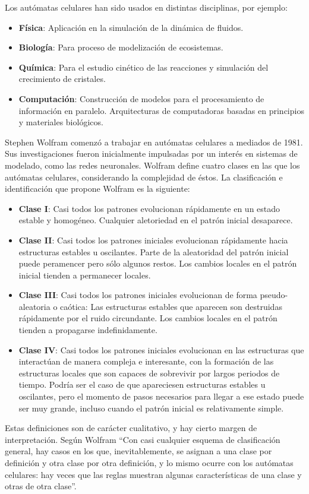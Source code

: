     Los autómatas celulares han sido usados en distintas disciplinas, por ejemplo:
      \begin{itemize}
        \item{\textbf{Física}: Aplicación en la simulación de la dinámica de fluidos.}
        \item{\textbf{Biología}: Para proceso de modelización de ecosistemas.}
        \item{\textbf{Química}: Para el estudio cinético de las reacciones y simulación del crecimiento de cristales.}
        \item{\textbf{Computación}: Construcción de modelos para el procesamiento de información en paralelo. Arquitecturas de computadoras basadas en principios y materiales biológicos. \cite{10}}
      \end{itemize}
    Stephen Wolfram comenzó a trabajar en autómatas celulares a mediados de 1981. Sus investigaciones fueron inicialmente impulsadas por un interés en sistemas de modelado, como las redes neuronales. Wolfram define cuatro clases en las que los autómatas celulares, considerando la complejidad de éstos. La clasificación e identificación que propone Wolfram es la siguiente:
      \begin{itemize}
        \item{\textbf{Clase I}: Casi todos los patrones evolucionan rápidamente en un estado estable y homogéneo. Cualquier aletoriedad en el patrón inicial desaparece.}
        \item{\textbf{Clase II}: Casi todos los patrones iniciales evolucionan rápidamente hacia estructuras estables u oscilantes. Parte de la aleatoridad del patrón inicial puede peramencer pero sólo algunos restos. Los cambios locales en el patrón inicial tienden a permanecer locales.}
        \item{\textbf{Clase III}: Casi todos los patrones iniciales evolucionan de forma pseudo-aleatoria o caótica: Las estructuras estables que aparecen son destruidas rápidamente por el ruido circundante. Los cambios locales en el patrón tienden a propagarse indefinidamente.}
        \item{\textbf{Clase IV}: Casi todos los patrones iniciales evolucionan en las estructuras que interactúan de manera compleja e interesante, con la formación de las estructuras locales que son capaces de sobrevivir por largos periodos de tiempo. Podría ser el caso de que apareciesen estructuras estables u oscilantes, pero el momento de pasos necesarios para llegar a ese estado puede ser muy grande, incluso cuando el patrón inicial es relativamente simple.}
      \end{itemize}
    Estas definiciones son de carácter cualitativo, y hay cierto margen de interpretación. Según Wolfram ``Con casi cualquier esquema de clasificación general, hay casos en los que, inevitablemente, se asignan a una clase por definición y otra clase por otra definición, y lo mismo ocurre con los autómatas celulares: hay veces que las reglas muestran algunas características de una clase y otras de otra clase''.\cite{11}